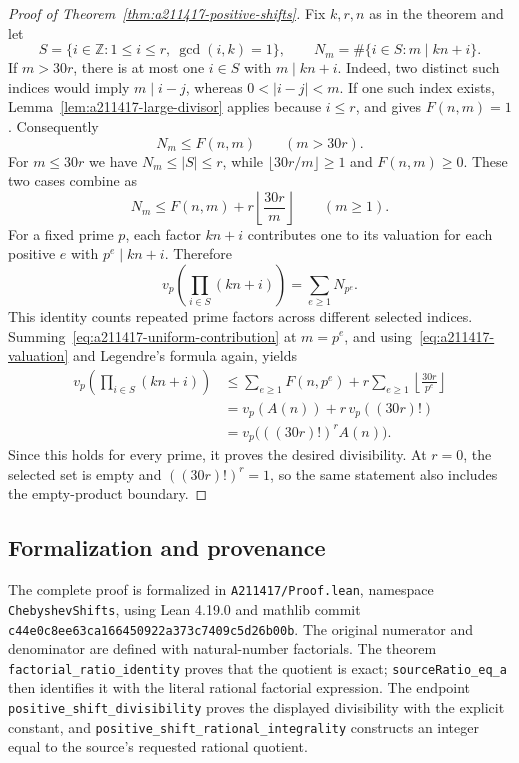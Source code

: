 \begin{proof}[Proof of Theorem~\ref{thm:a211417-positive-shifts}]
Fix $k,r,n$ as in the theorem and let
\[
 S=\{i\in\mathbb Z:1\le i\le r,\ \gcd(i,k)=1\},
 \qquad N_m=\#\{i\in S:m\mid kn+i\}.
\]
If $m>30r$, there is at most one $i\in S$ with $m\mid kn+i$.
Indeed, two distinct such indices would imply $m\mid i-j$, whereas
$0<|i-j|<m$.  If one such index exists, Lemma~\ref{lem:a211417-large-divisor}
applies because $i\le r$, and gives $F(n,m)=1$.  Consequently
\[
 N_m\le F(n,m)\qquad(m>30r).
\]
For $m\le30r$ we have $N_m\le|S|\le r$, while
$\lfloor30r/m\rfloor\ge1$ and $F(n,m)\ge0$.  These two cases combine as
\begin{equation}
\label{eq:a211417-uniform-contribution}
 N_m\le F(n,m)+r\left\lfloor\frac{30r}{m}\right\rfloor
 \qquad(m\ge1).
\end{equation}
For a fixed prime $p$, each factor $kn+i$ contributes one to its
valuation for each positive $e$ with $p^e\mid kn+i$.  Therefore
\[
 v_p\left(\prod_{i\in S}(kn+i)\right)=\sum_{e\ge1}N_{p^e}.
\]
This identity counts repeated prime factors across different selected
indices.  Summing~\eqref{eq:a211417-uniform-contribution} at $m=p^e$,
and using~\eqref{eq:a211417-valuation} and Legendre's formula again,
yields
\begin{align*}
 v_p\left(\prod_{i\in S}(kn+i)\right)
 &\le \sum_{e\ge1}F(n,p^e)
       +r\sum_{e\ge1}\left\lfloor\frac{30r}{p^e}\right\rfloor\\
 &=v_p(A(n))+r\,v_p((30r)!)\\
 &=v_p\bigl(((30r)!)^r A(n)\bigr).
\end{align*}
Since this holds for every prime, it proves the desired divisibility.
At $r=0$, the selected set is empty and $((30r)!)^r=1$, so the same
statement also includes the empty-product boundary.
\end{proof}

\subsection{Formalization and provenance}

The complete proof is formalized in \texttt{A211417/Proof.lean}, namespace
\texttt{ChebyshevShifts}, using Lean 4.19.0 and mathlib commit
\texttt{c44e0c8ee63ca166450922a373c7409c5d26b00b}.
The original numerator and denominator are defined with natural-number
factorials.  The theorem \texttt{factorial\_ratio\_identity} proves
that the quotient is exact; \texttt{sourceRatio\_eq\_a} then identifies
it with the literal rational factorial expression.
The endpoint \texttt{positive\_shift\_divisibility} proves the displayed
divisibility with the explicit constant, and
\texttt{positive\_shift\_rational\_integrality} constructs an integer
equal to the source's requested rational quotient.

